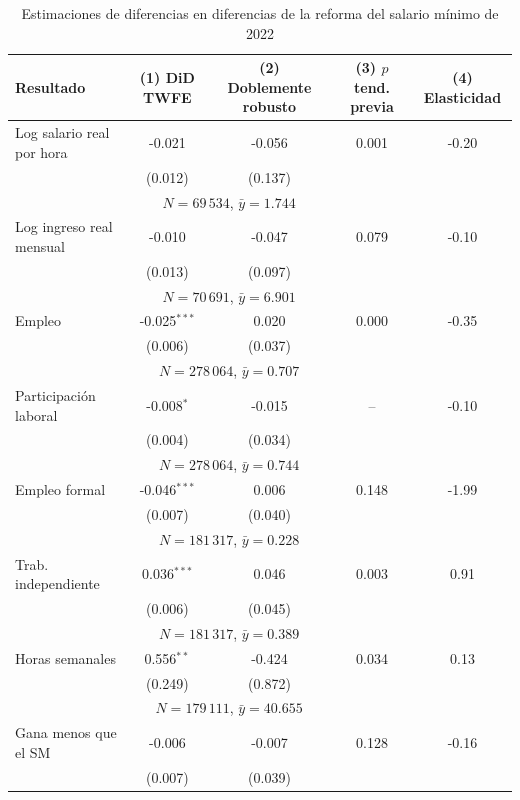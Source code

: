 \begin{table}[!tbp]\centering
\caption{Estimaciones de diferencias en diferencias de la reforma del salario mínimo de 2022}\label{tab:main}
\begin{threeparttable}
\footnotesize
\setlength{\tabcolsep}{4pt}
\begin{tabular}{lcccc}
\toprule
Resultado & (1) DiD TWFE & (2) Doblemente robusto & (3) $p$ tend. previa & (4) Elasticidad \\
\midrule
Log salario real por hora & -0.021 & -0.056 & 0.001 & -0.20 \\
 & (0.012) & (0.137) & & \\
 & \multicolumn{2}{c}{\footnotesize $N=69\,534$, $\bar{y}=1.744$} & & \\
Log ingreso real mensual & -0.010 & -0.047 & 0.079 & -0.10 \\
 & (0.013) & (0.097) & & \\
 & \multicolumn{2}{c}{\footnotesize $N=70\,691$, $\bar{y}=6.901$} & & \\
Empleo & -0.025$^{***}$ & 0.020 & 0.000 & -0.35 \\
 & (0.006) & (0.037) & & \\
 & \multicolumn{2}{c}{\footnotesize $N=278\,064$, $\bar{y}=0.707$} & & \\
Participación laboral & -0.008$^{*}$ & -0.015 & -- & -0.10 \\
 & (0.004) & (0.034) & & \\
 & \multicolumn{2}{c}{\footnotesize $N=278\,064$, $\bar{y}=0.744$} & & \\
Empleo formal & -0.046$^{***}$ & 0.006 & 0.148 & -1.99 \\
 & (0.007) & (0.040) & & \\
 & \multicolumn{2}{c}{\footnotesize $N=181\,317$, $\bar{y}=0.228$} & & \\
Trab. independiente & 0.036$^{***}$ & 0.046 & 0.003 & 0.91 \\
 & (0.006) & (0.045) & & \\
 & \multicolumn{2}{c}{\footnotesize $N=181\,317$, $\bar{y}=0.389$} & & \\
Horas semanales & 0.556$^{**}$ & -0.424 & 0.034 & 0.13 \\
 & (0.249) & (0.872) & & \\
 & \multicolumn{2}{c}{\footnotesize $N=179\,111$, $\bar{y}=40.655$} & & \\
Gana menos que el SM & -0.006 & -0.007 & 0.128 & -0.16 \\
 & (0.007) & (0.039) & & \\

\end{tabular}
\end{threeparttable}
\end{table}
